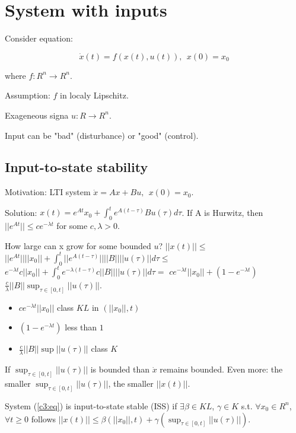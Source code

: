 \section{System with inputs}

Consider equation:

\begin{equation}\label{c3:eq}
 \dot x(t)=f(x(t),u(t)), \ \ x(0)=x_0
\end{equation}

where $f:R^n\to R^n$.

Assumption: $f$ in localy Lipschitz.

Exageneous signa $u:R\to R^n$.

Input can be "bad" (disturbance) or "good" (control).

\subsection{Input-to-state stability}

Motivation: LTI system $\dot x=Ax+Bu, \ \ x(0)=x_0$.

Solution: $x(t)=e^{At}x_0+\int_0^t e^{A(t-\tau)}Bu(\tau) d\tau$.
If A is Hurwitz, then $||e^{At}||\le c e^{-\lambda t}$ for some $c,\lambda>0$.

How large can x grow for some bounded $u$? 
$||x(t)||\le$
$||e^{At}|| ||x_0||+\int_0^t||e^{A(t-\tau)}|| ||B|| ||u(\tau)|| d\tau\le$
$e^{-\lambda t}c||x_0||+\int_0^t e^{-\lambda(t-\tau)}c||B|| ||u(\tau)|| d\tau =$
$c e^{-\lambda t}||x_0||+(1-e^{-\lambda t})$
$\frac{c}{\lambda}||B||\sup_{\tau\in[0,t]} ||u(\tau)||$.

\begin{itemize}
 \item $c e^{-\lambda t}||x_0||$ class $KL$ in $(||x_0||,t)$
 \item $(1-e^{-\lambda t})$ less than $1$
 \item $\frac{c}{\lambda}||B||\sup ||u(\tau)||$ class $K$ 
\end{itemize}

If $\sup_{\tau\in[0,t]} ||u(\tau)||$ is bounded than $\dot x$ remains bounded.
Even more: the smaller $\sup_{\tau\in[0,t]} ||u(\tau)||$, the smaller $||x(t)||$.

\begin{Definition}
 System (\ref{c3:eq}) is input-to-state stable (ISS) if $\exists \beta\in KL$,
 $\gamma\in K$ s.t. $\forall x_0\in R^n$, $\forall t \ge 0$ follows 
 $||x(t)||\le\beta(||x_0||, t)+\gamma(\sup_{\tau\in[0,t]} ||u(\tau)||)$.
\end{Definition}

